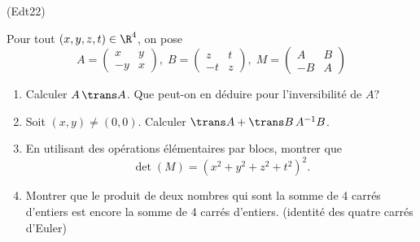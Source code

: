 \begin{tiny}(Edt22)\end{tiny} Pour tout $(x,y,z,t)\in\R^4$, on pose
\begin{displaymath}
 A=
 \begin{pmatrix}
  x & y \\ -y & x
 \end{pmatrix}, \;
 B=
 \begin{pmatrix}
  z & t \\ -t & z
 \end{pmatrix}, \;
 M =
\begin{pmatrix}
 A  & B  \\ -B & A
\end{pmatrix}
\end{displaymath}
\begin{enumerate}
 \item Calculer $A\, \trans A$. Que peut-on en déduire pour l'inversibilité de $A$?
 \item Soit $(x,y)\neq (0,0)$. Calculer $\trans A + \trans B\, A^{-1} B$.
 \item En utilisant des opérations élémentaires par blocs, montrer que
 \[
  \det(M) = (x^2 + y^2 + z^2 +t^2)^2.
 \]
 \item Montrer que le produit de deux nombres qui sont la somme de 4 carrés d'entiers est encore la somme de 4 carrés d'entiers. (identité des quatre carrés d'Euler)
\end{enumerate}
 